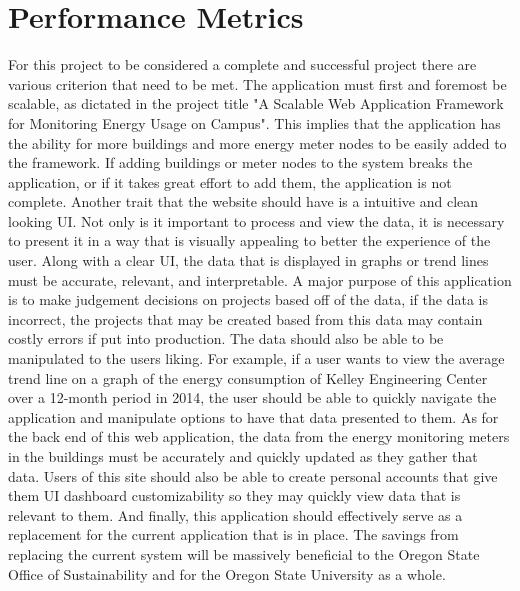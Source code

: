 \documentclass[onecolumn, draftclsnofoot,10pt, compsoc]{IEEEtran}
\begin{document}
\section{Performance Metrics}
	For this project to be considered a complete and successful project there are various criterion that need to be met. The application must first and 
	foremost be scalable, as dictated in the project title "A Scalable Web Application Framework for Monitoring Energy Usage on Campus". This implies that the
	application has the ability for more buildings and more energy meter nodes to be easily added to the framework. If adding buildings or meter nodes to the
	system breaks the application, or if it takes great effort to add them, the application is not complete. Another trait that the website should have is 
	a intuitive and clean looking UI. Not only is it important to process and view the data, it is necessary to present it in a way that is visually appealing
	to better the experience of the user. Along with a clear UI, the data that is displayed in graphs or trend lines must be accurate, relevant, and interpretable.
	A major purpose of this application is to make judgement decisions on projects based off of the data, if the data is incorrect, the projects that may be created
	based from this data may contain costly errors if put into production. The data should also be able to be manipulated to the users liking. For example, 
	if a user wants to view the average trend line on a graph of the energy consumption of Kelley Engineering Center over a 12-month period in 2014, the user should
	be able to quickly navigate the application and manipulate options to have that data presented to them. As for the back end of this web application, the data 
	from the energy monitoring meters in the buildings must be accurately and quickly updated as they gather that data. Users of this site should also be able to 
	create personal accounts that give them UI dashboard customizability so they may quickly view data that is relevant to them. And finally, this application should
	effectively serve as a replacement for the current application that is in place. The savings from replacing the current system will be massively beneficial to 
	the Oregon State Office of Sustainability and for the Oregon State University as a whole.
	
\end{document}
